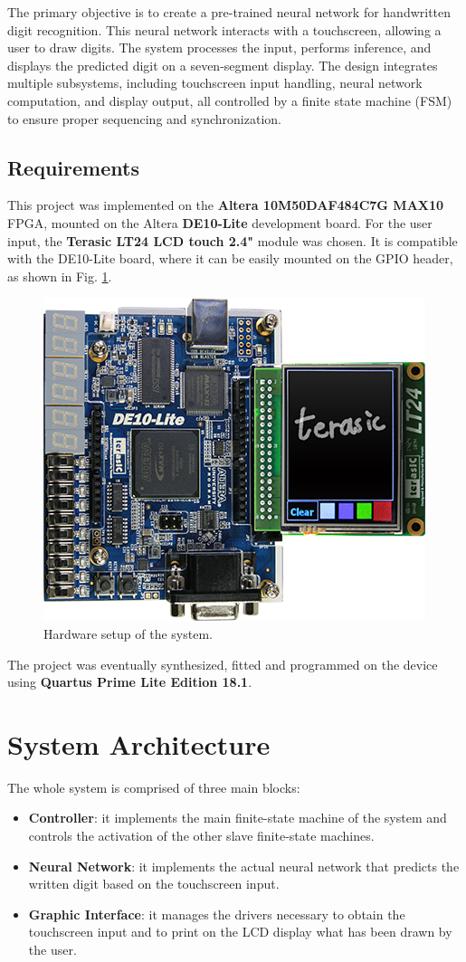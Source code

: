 \documentclass[11pt]{report}
\begin{document}
The primary objective is to create a pre-trained neural network for handwritten digit recognition. This neural network interacts with a touchscreen, allowing a user to draw digits. The system processes the input, performs inference, and displays the predicted digit on a seven-segment display. The design integrates multiple subsystems, including touchscreen input handling, neural network computation, and display output, all controlled by a finite state machine (FSM) to ensure proper sequencing and synchronization.  

\section{Requirements}
This project was implemented on the \textbf{Altera 10M50DAF484C7G MAX10} FPGA, mounted on the Altera \textbf{DE10-Lite} development board. For the user input, the \textbf{Terasic LT24 LCD touch 2.4"} module was chosen. It is compatible with the DE10-Lite board, where it can be easily mounted on the GPIO header, as shown in Fig. \ref{fig:hw_preview}.

\begin{figure}[!h]
    \centering
    \includegraphics[width=0.5\linewidth]{images/introduction/hardware_preview.png}
    \caption{Hardware setup of the system.}
    \label{fig:hw_preview}
\end{figure}

The project was eventually synthesized, fitted and programmed on the device using \textbf{Quartus Prime Lite Edition 18.1}.


\chapter{System Architecture}
The whole system is comprised of three main blocks:

\begin{itemize}
    \item \textbf{Controller}: it implements the main finite-state machine of the system and controls the activation of the other slave finite-state machines.
    \item \textbf{Neural Network}: it implements the actual neural network that predicts the written digit based on the touchscreen input.
    \item \textbf{Graphic Interface}: it manages the drivers necessary to obtain the touchscreen input and to print on the LCD display what has been drawn by the user.
\end{itemize}
\end{document}
